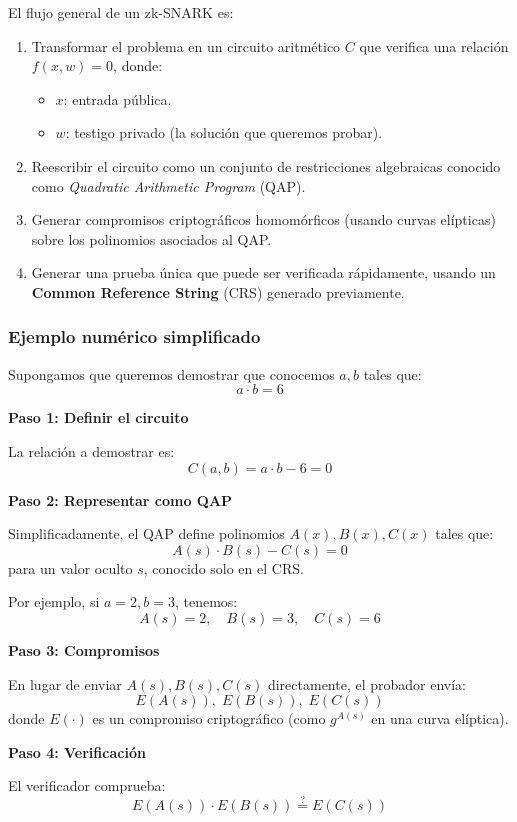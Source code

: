 \documentclass{article}
\begin{document}
El flujo general de un zk-SNARK es:
\begin{enumerate}
    \item Transformar el problema en un circuito aritmético \( C \) que verifica una relación \( f(x, w) = 0 \), donde:
        \begin{itemize}
            \item \( x \): entrada pública.
            \item \( w \): testigo privado (la solución que queremos probar).
        \end{itemize}
    \item Reescribir el circuito como un conjunto de restricciones algebraicas conocido como \textit{Quadratic Arithmetic Program} (QAP).
    \item Generar compromisos criptográficos homomórficos (usando curvas elípticas) sobre los polinomios asociados al QAP.
    \item Generar una prueba única que puede ser verificada rápidamente, usando un \textbf{Common Reference String} (CRS) generado previamente.
\end{enumerate}

\subsubsection{Ejemplo numérico simplificado}

Supongamos que queremos demostrar que conocemos \( a, b \) tales que:
\[
a \cdot b = 6
\]

\textbf{Paso 1: Definir el circuito}

La relación a demostrar es:
\[
C(a, b) = a \cdot b - 6 = 0
\]

\textbf{Paso 2: Representar como QAP}

Simplificadamente, el QAP define polinomios \( A(x), B(x), C(x) \) tales que:
\[
A(s) \cdot B(s) - C(s) = 0
\]
para un valor oculto \( s \), conocido solo en el CRS.

Por ejemplo, si \( a = 2, b = 3 \), tenemos:
\[
A(s) = 2, \quad B(s) = 3, \quad C(s) = 6
\]

\textbf{Paso 3: Compromisos}

En lugar de enviar \( A(s), B(s), C(s) \) directamente, el probador envía:
\[
E(A(s)), \; E(B(s)), \; E(C(s))
\]
donde \( E(\cdot) \) es un compromiso criptográfico (como \( g^{A(s)} \) en una curva elíptica).

\textbf{Paso 4: Verificación}

El verificador comprueba:
\[
E(A(s)) \cdot E(B(s)) \stackrel{?}{=} E(C(s))
\]
\end{document}

